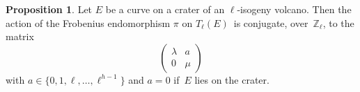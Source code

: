 \documentclass[10pt,a4paper]{beamer}
\theoremstyle{plain}
\theoremstyle{definition}
\theoremstyle{definition}
\theoremstyle{definition}
\newtheorem{prop}[thm]{Proposition}
\theoremstyle{definition}
\theoremstyle{remark}
\theoremstyle{remark}
\begin{document}
\begin{frame}

\begin{prop}\label{prop:matrice-Frobenius}
Let $E$ be a curve on a crater of an $\ell$-isogeny volcano.
Then the action of the Frobenius endomorphism $\pi$ on $T_\ell(E)$~is conjugate, over~$\mathbb{Z}_\ell$,
to the matrix \[\left ( \begin{matrix}\lambda & a\\ 0 & \mu \end{matrix}\right ) \]  with $a \in \{ 0,1,\ell, \dots, \ell^{h-1}  \}$ and $a = 0$ if~$E$ lies on the crater.

\end{prop}

\begin{figure}
\begin{center}


\end{center}
\end{figure}
\end{frame}
\end{document}
